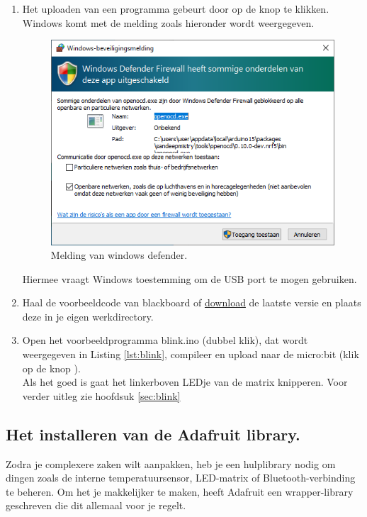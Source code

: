 \begin{enumerate}
\item Het uploaden van een programma gebeurt door op de knop  te klikken. Windows komt met de melding zoals hieronder wordt weergegeven. 
   	\begin{figure}[h!]
   	\captionsetup{justification=centering}
   	\includegraphics[width=0.45 \linewidth]{figuren/windowsDefSec}
   	\centering
   	\caption{Melding van windows defender.}
   	\label{fig:windowsDef}
   \end{figure}
Hiermee vraagt Windows toestemming om de USB port te mogen gebruiken.
\item Haal de voorbeeldcode van blackboard of \href{https://github.com/JohnVi-hhs/embsysP/tree/main/voorbeelden/blink.ino}{download} de laatste versie en plaats deze in je eigen werkdirectory.
\item \label{en:blink} Open het voorbeeldprogramma blink.ino (dubbel klik), dat wordt weergegeven in Listing \ref{lst:blink}, compileer en upload naar de micro:bit (klik op de knop ). \\
Als het goed is gaat het linkerboven LEDje van de matrix knipperen. Voor verder uitleg zie hoofdsuk \ref{sec:blink}


\end{enumerate}

\subsection{Het installeren van de Adafruit library.}

Zodra je complexere zaken wilt aanpakken, heb je een hulplibrary nodig om dingen zoals de interne temperatuursensor, LED-matrix of Bluetooth-verbinding te beheren.
Om het je makkelijker te maken, heeft Adafruit een wrapper-library geschreven die dit allemaal voor je regelt.

